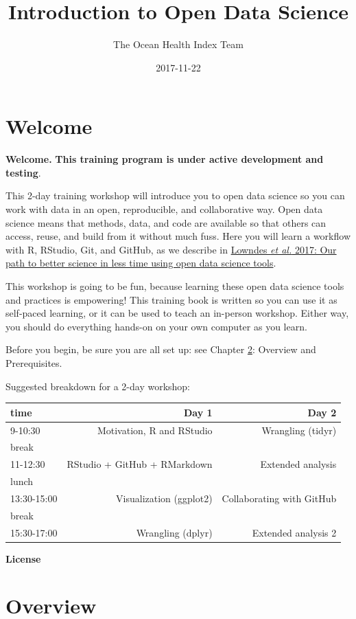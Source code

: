 \documentclass[]{book}
\title{Introduction to Open Data Science}
\author{The Ocean Health Index Team}
\date{2017-11-22}
\theoremstyle{definition}
\theoremstyle{definition}
\theoremstyle{definition}
\theoremstyle{remark}
\begin{document}
\maketitle

{
\setcounter{tocdepth}{1}
\tableofcontents
}
\chapter{Welcome}\label{welcome}

\textbf{Welcome.} \textbf{This training program is under active
development and testing}.

This 2-day training workshop will introduce you to open data science so
you can work with data in an open, reproducible, and collaborative way.
Open data science means that methods, data, and code are available so
that others can access, reuse, and build from it without much fuss. Here
you will learn a workflow with R, RStudio, Git, and GitHub, as we
describe in
\href{https://www.nature.com/articles/s41559-017-0160}{Lowndes \emph{et
al.} 2017: Our path to better science in less time using open data
science tools}.

This workshop is going to be fun, because learning these open data
science tools and practices is empowering! This training book is written
so you can use it as self-paced learning, or it can be used to teach an
in-person workshop. Either way, you should do everything hands-on on
your own computer as you learn.

Before you begin, be sure you are all set up: see Chapter
\ref{overview}: Overview and Prerequisites.

Suggested breakdown for a 2-day workshop:

\begin{longtable}[]{@{}lrr@{}}
\toprule
time & Day 1 & Day 2\tabularnewline
\midrule
\endhead
9-10:30 & Motivation, R and RStudio & Wrangling (tidyr)\tabularnewline
break & &\tabularnewline
11-12:30 & RStudio + GitHub + RMarkdown & Extended
analysis\tabularnewline
lunch & &\tabularnewline
13:30-15:00 & Visualization (ggplot2) & Collaborating with
GitHub\tabularnewline
break & &\tabularnewline
15:30-17:00 & Wrangling (dplyr) & Extended analysis 2\tabularnewline
\bottomrule
\end{longtable}

\textbf{License}

\chapter{Overview}\label{overview}
\end{document}

